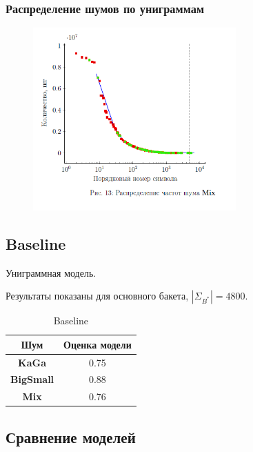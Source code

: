 \documentclass[aspectratio=169, pdf, 9pt, utf8]{beamer}
\begin{document}
\begin{frame}
	\frametitle{Распределение шумов по униграммам}
	
	\begin{center}
	\begin{figure}[H]
		\includegraphics[height=7cm]{p_ndistr.png}
	\end{figure}
\end{center}
\end{frame}

\subsection{ Baseline }

\begin{frame}
	Униграммная модель.
	
	Результаты показаны для основного бакета, $|\Sigma_{B^*}| = 4800$.
	
	\begin{table}[H]
		\begin{center}
			\begin{tabular}{|c|c|} \hline
				Шум 	& Оценка модели \\ \hline
				\textbf{KaGa}	& 0.75  \\
				\textbf{BigSmall} & 0.88  \\
				\textbf{Mix} & 0.76 \\ \hline
			\end{tabular}
			\caption{Baseline}
			\label{table:baseline}
		\end{center}
	\end{table}
	
\end{frame}

\subsection{ Сравнение моделей }
\end{document}
